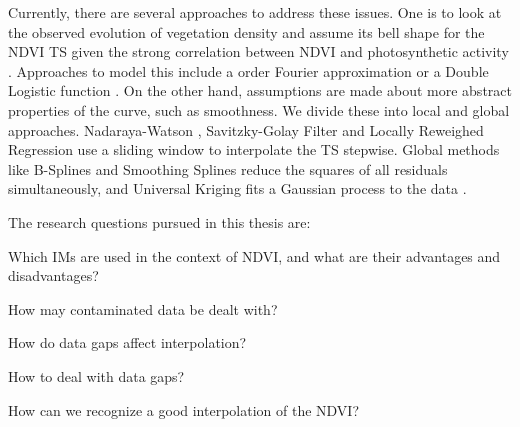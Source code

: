 Currently, there are several approaches to address these issues. One is to look at the observed evolution of vegetation density and assume its bell shape for the NDVI {TS} given the strong correlation between NDVI and photosynthetic activity \citep{gamonRelationshipsNDVICanopy1995a}. Approaches to model this include a  order Fourier approximation \citep{stockliEuropeanPlantPhenology2004} or a Double Logistic function \citep{beckImprovedMonitoringVegetation2006}.
On the other hand, assumptions are made about more abstract properties of the curve, such as smoothness. We divide these into local and global approaches. Nadaraya-Watson \citep{strbacEstimationEvapotrasnpirationUrban2017}, Savitzky-Golay Filter \citep{chenSimpleMethodReconstructing2004a} and Locally Reweighed Regression \citep{omoriAssessmentPaddyFields2021} use a sliding window to interpolate the {TS} stepwise. Global methods like B-Splines \citep{gurungPredictingEnhancedVegetation2009} and Smoothing Splines \citep{caiPerformanceSmoothingMethods2017} reduce the squares of all residuals simultaneously, and Universal Kriging fits a Gaussian process to the data \citep{chandolaScalableTimeSeries2010}.

\bigskip
The research questions pursued in this thesis are:
\begin{Nenumerate}
    \item Which {{IM}}s are used in the context of NDVI, and what are their advantages and disadvantages?
    \item How may contaminated data be dealt with?
    \item How do data gaps affect interpolation?
    \item How to deal with data gaps?
    \item How can we recognize a good interpolation of the NDVI?
\end{Nenumerate}
\bigskip



